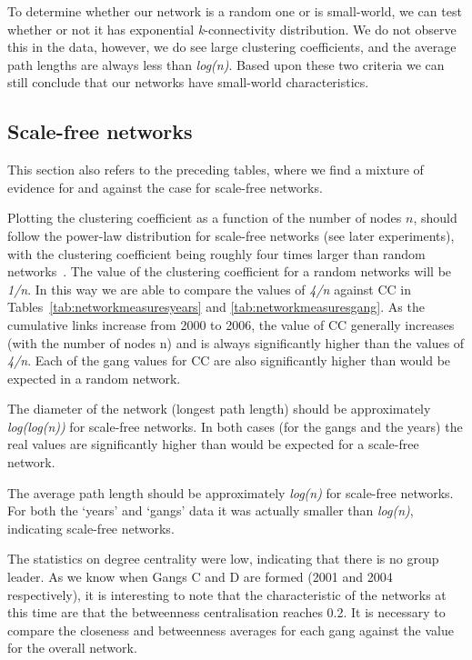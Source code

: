 \documentclass[twocolumn]{svjour3}          %
\theoremstyle{definition}
\begin{document}
To determine whether our network is a random one or is small-world, we
can test whether or not it has exponential \emph{k}-connectivity
distribution. We do not observe this in the data, however, we do see
large clustering coefficients, and the average path lengths are always
less than {\emph{log(n)}}. Based upon these two criteria we can still
conclude that our networks have small-world characteristics.


\subsection{Scale-free networks}\label{sec:scalefree}

This section also refers to the preceding tables, where we find a
mixture of evidence for and against the case for scale-free networks.

Plotting the clustering coefficient as a function of the number of
nodes $n$, should follow the power-law distribution for scale-free
networks (see later experiments), with the clustering coefficient
being roughly four times larger than random
networks~\citep{AlbAlbNak04}. The value of the clustering coefficient
for a random networks will be \emph{1/n}. In this way we are able to
compare the values of \emph{4/n} against CC in
Tables~\ref{tab:networkmeasuresyears} and
\ref{tab:networkmeasuresgang}. As the cumulative links increase from
2000 to 2006, the value of CC generally increases (with the number of
nodes n) and is always significantly higher than the values of
\emph{4/n}. Each of the gang values for CC are also significantly
higher than would be expected in a random network.

The diameter of the network (longest path length) should be
approximately \emph{log(log(n))} for scale-free networks. In both
cases (for the gangs and the years) the real values are significantly
higher than would be expected for a scale-free network.

The average path length should be approximately \emph{log(n)} for
scale-free networks. For both the `years' and `gangs' data it was
actually smaller than \emph{log(n)}, indicating scale-free networks.

The statistics on degree centrality were low, indicating that there is
no group leader. As we know when Gangs C and D are formed (2001
and 2004 respectively), it is interesting to note that the
characteristic of the networks at this time are that the betweenness
centralisation reaches 0.2. It is necessary to compare the closeness and
betweenness averages for each gang against the value for the overall
network.
\end{document}
